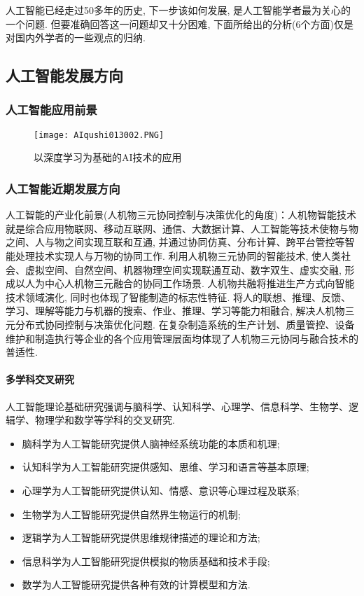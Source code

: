 人工智能已经走过50多年的历史, 下一步该如何发展, 是人工智能学者最为关心的一个问题. 但要准确回答这一问题却又十分困难, 下面所给出的分析(6个方面)仅是对国内外学者的一些观点的归纳.
\subsection{人工智能发展方向}
\subsubsection{人工智能应用前景}
\begin{figure}[H]
\centering
\texttt{[image: AIqushi013002.PNG]}
\caption{以深度学习为基础的AI技术的应用}
\label{AIqushi013002}
\end{figure}
\subsubsection{人工智能近期发展方向}
人工智能的产业化前景(人机物三元协同控制与决策优化的角度)：人机物智能技术就是综合应用物联网、移动互联网、通信、大数据计算、人工智能等技术使物与物之间、人与物之间实现互联和互通, 并通过协同仿真、分布计算、跨平台管控等智能处理技术实现人与万物的协同工作. 利用人机物三元协同的智能技术, 使人类社会、虚拟空间、自然空间、机器物理空间实现联通互动、数字双生、虚实交融, 形成以人为中心人机物三元融合的协同工作场景. 人机物共融将推进生产方式向智能技术领域演化, 同时也体现了智能制造的标志性特征. 将人的联想、推理、反馈、学习、理解等能力与机器的搜索、作业、推理、学习等能力相融合, 解决人机物三元分布式协同控制与决策优化问题. 在复杂制造系统的生产计划、质量管控、设备维护和制造执行等企业的各个应用管理层面均体现了人机物三元协同与融合技术的普适性.
\paragraph{多学科交叉研究}

人工智能理论基础研究强调与脑科学、认知科学、心理学、信息科学、生物学、逻辑学、物理学和数学等学科的交叉研究.
\begin{itemize}
\item  脑科学为人工智能研究提供人脑神经系统功能的本质和机理;
\item  认知科学为人工智能研究提供感知、思维、学习和语言等基本原理;
\item  心理学为人工智能研究提供认知、情感、意识等心理过程及联系;
\item  生物学为人工智能研究提供自然界生物运行的机制;
\item  逻辑学为人工智能研究提供思维规律描述的理论和方法;
\item  信息科学为人工智能研究提供模拟的物质基础和技术手段;
\item  数学为人工智能研究提供各种有效的计算模型和方法.
\end{itemize}
